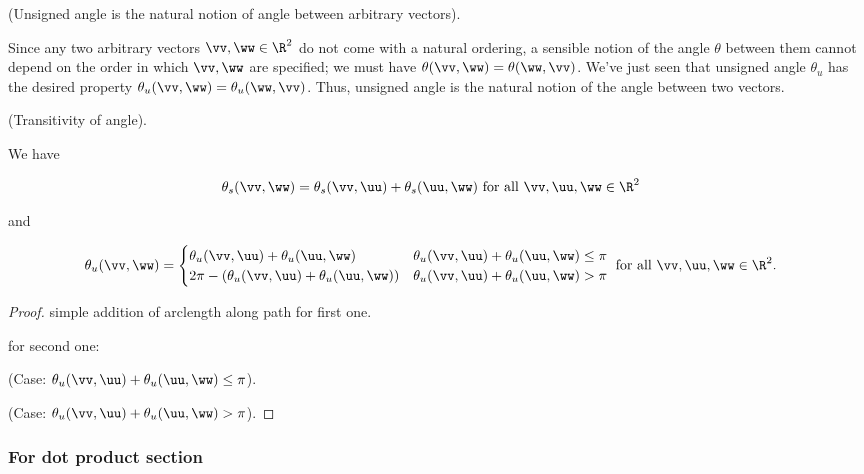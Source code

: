\begin{remark}
    (Unsigned angle is the natural notion of angle between arbitrary vectors).

    Since any two arbitrary vectors $\vv, \ww \in \R^2$ do not come with a natural ordering, a sensible notion of the angle $\theta$ between them cannot depend on the order in which $\vv, \ww$ are specified; we must have $\theta(\vv, \ww) = \theta(\ww, \vv)$. We've just seen that unsigned angle $\theta_u$ has the desired property $\theta_u(\vv, \ww) = \theta_u(\ww, \vv)$. Thus, unsigned angle is the natural notion of the angle between two vectors. 
\end{remark}

\begin{theorem}
\label{ch::lin_alg::thm::transitivity_of_angle}
    (Transitivity of angle).

    We have

    \begin{align*}
        \theta_s(\vv, \ww) &= \theta_s(\vv, \uu) + \theta_s(\uu, \ww) \text{ for all $\vv, \uu, \ww \in \R^2$}
    \end{align*}

    and

    \begin{align*}
        \theta_u(\vv, \ww) &=
        \begin{cases}
            \theta_u(\vv, \uu) + \theta_u(\uu, \ww) & \theta_u(\vv, \uu) + \theta_u(\uu, \ww) \leq \pi \\
            2\pi - (\theta_u(\vv, \uu) + \theta_u(\uu, \ww)) & \theta_u(\vv, \uu) + \theta_u(\uu, \ww) > \pi 
        \end{cases} \text{ for all $\vv, \uu, \ww \in \R^2$}.
    \end{align*}
\end{theorem}

\begin{proof}
    simple addition of arclength along path for first one.

    for second one:

    (Case: $\theta_u(\vv, \uu) + \theta_u(\uu, \ww) \leq \pi$).

    (Case: $\theta_u(\vv, \uu) + \theta_u(\uu, \ww) > \pi$).
\end{proof}

\subsubsection*{For dot product section}

